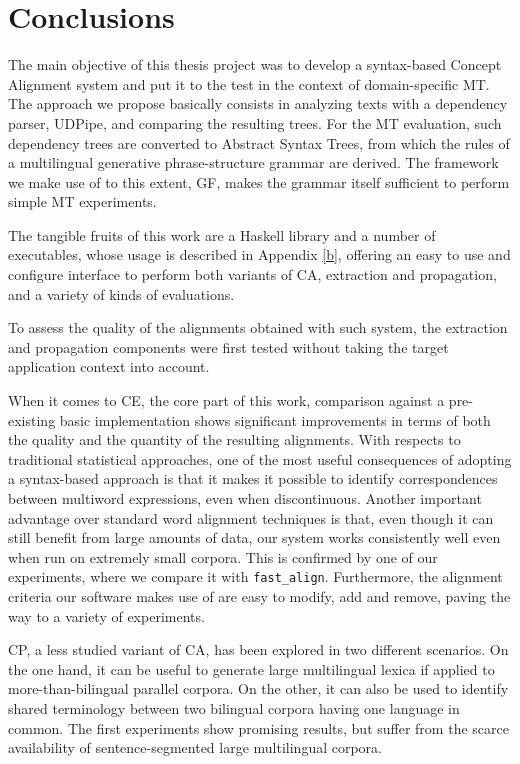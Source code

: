 \chapter{Conclusions} \label{ch6}

The main objective of this thesis project was to develop a syntax-based Concept Alignment system and put it to the test in the context of domain-specific MT. The approach we propose basically consists in analyzing texts with a dependency parser, UDPipe, and comparing the resulting trees. For the MT evaluation, such dependency trees are converted to Abstract Syntax Trees, from which the rules of a multilingual generative phrase-structure grammar are derived. The framework we make use of to this extent, GF, makes the grammar itself sufficient to perform simple MT experiments.\smallskip

The tangible fruits of this work are a Haskell library and a number of executables, whose usage is described in Appendix \ref{b}, offering an easy to use and configure interface to perform both variants of CA, extraction and propagation, and a variety of kinds of evaluations. \smallskip

To assess the quality of the alignments obtained with such system, the extraction and propagation components were first tested without taking the target application context into account. \smallskip

When it comes to CE, the core part of this work, comparison against a pre-existing basic implementation shows significant improvements in terms of both the quality and the quantity of the resulting alignments. 
With respects to traditional statistical approaches, one of the most useful consequences of adopting a syntax-based approach is that it makes it possible to identify correspondences between multiword expressions, even when discontinuous. 
Another important advantage over standard word alignment techniques is that, even though it can still benefit from large amounts of data, our system works consistently well even when run on extremely small corpora. This is confirmed by one of our experiments, where we compare it with \texttt{fast\_align}. 
Furthermore, the alignment criteria our software makes use of are easy to modify, add and remove, paving the way to a variety of experiments. \smallskip

CP, a less studied variant of CA, has been explored in two different scenarios. On the one hand, it can be useful to generate large multilingual lexica if applied to more-than-bilingual parallel corpora. On the other, it can also be used to identify shared terminology between two bilingual corpora having one language in common. The first experiments show promising results, but suffer from the scarce availability of sentence-segmented large multilingual corpora. \smallskip

